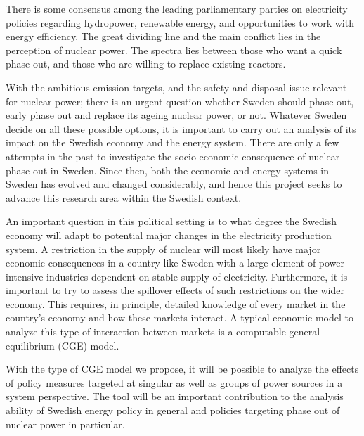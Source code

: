There is some consensus among the leading parliamentary parties on electricity policies regarding hydropower, renewable energy, and opportunities to work with energy efficiency. The great dividing line and the main conflict lies in the perception of nuclear power. The spectra lies between those who want a quick phase out, and those who are willing to replace existing reactors.

With the ambitious emission targets, and the safety and disposal issue relevant for nuclear power; there is an urgent question whether Sweden should phase out, early phase out and replace its ageing nuclear power, or not. Whatever Sweden decide on all these possible options, it is important to carry out an analysis of its impact on the Swedish economy and the energy system. There are only a few attempts in the past to investigate the socio-economic consequence of nuclear phase out in Sweden. Since then, both the economic and energy systems in Sweden has evolved and changed considerably, and hence this project seeks to advance this research area within the Swedish context. 

An important question in this political setting is to what degree the Swedish economy will adapt to potential major changes in the electricity production system. A restriction in the supply of nuclear will most likely have major economic consequences in a country like Sweden with a large element of power-intensive industries dependent on stable supply of electricity. Furthermore, it is important to try to assess the spillover effects of such restrictions on the wider economy. This requires, in principle, detailed knowledge of every market in the country's economy and how these markets interact. A typical economic model to analyze this type of interaction between markets is a computable general equilibrium (CGE) model.

With the type of CGE model we propose, it will be possible to analyze the effects of policy measures targeted at singular as well as groups of power sources in a system perspective. The tool will be an important contribution to the analysis ability of Swedish energy policy in general and policies targeting phase out of nuclear power in particular.

